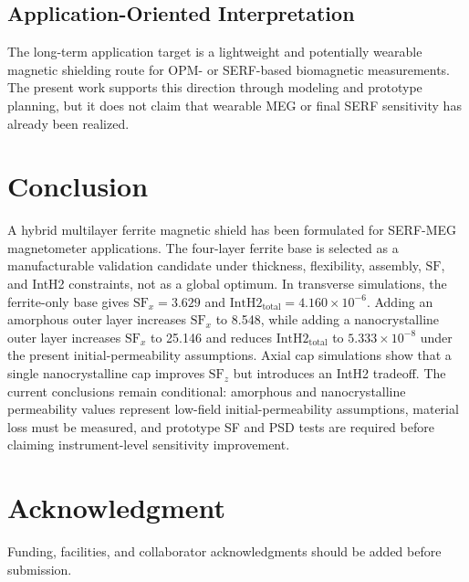\documentclass[letterpaper,journal]{IEEEtran}
\begin{document}
\subsection{Application-Oriented Interpretation}

The long-term application target is a lightweight and potentially wearable magnetic shielding route for OPM- or SERF-based biomagnetic measurements. The present work supports this direction through modeling and prototype planning, but it does not claim that wearable MEG or final SERF sensitivity has already been realized.

\section{Conclusion}

A hybrid multilayer ferrite magnetic shield has been formulated for SERF-MEG magnetometer applications. The four-layer ferrite base is selected as a manufacturable validation candidate under thickness, flexibility, assembly, $\mathrm{SF}$, and IntH2 constraints, not as a global optimum. In transverse simulations, the ferrite-only base gives $\mathrm{SF}_x=3.629$ and $\mathrm{IntH2}_{\mathrm{total}}=4.160\times10^{-6}$. Adding an amorphous outer layer increases $\mathrm{SF}_x$ to 8.548, while adding a nanocrystalline outer layer increases $\mathrm{SF}_x$ to 25.146 and reduces $\mathrm{IntH2}_{\mathrm{total}}$ to $5.333\times10^{-8}$ under the present initial-permeability assumptions. Axial cap simulations show that a single nanocrystalline cap improves $\mathrm{SF}_z$ but introduces an IntH2 tradeoff. The current conclusions remain conditional: amorphous and nanocrystalline permeability values represent low-field initial-permeability assumptions, material loss must be measured, and prototype SF and PSD tests are required before claiming instrument-level sensitivity improvement.

\section*{Acknowledgment}
Funding, facilities, and collaborator acknowledgments should be added before submission.
\end{document}
